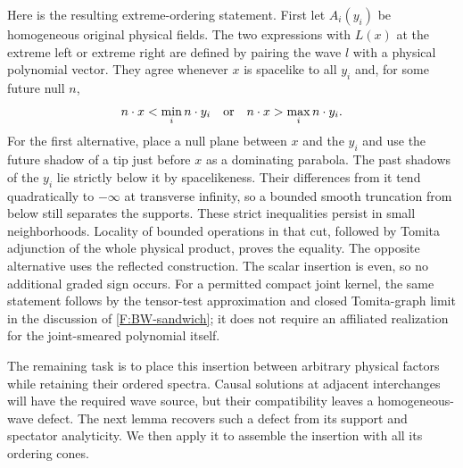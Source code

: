 Here is the resulting extreme-ordering statement. First let
$A_i(y_i)$ be homogeneous original physical fields. The two
expressions with $L(x)$ at the extreme left or
extreme right are defined by pairing the wave $l$ with a physical
polynomial vector. They agree whenever $x$ is spacelike to all $y_i$ and,
for some future null $n$,
\begin{equation}\label{C:extreme-patch}
 n\cdot x<\min_i n\cdot y_i
 \quad\hbox{or}\quad
 n\cdot x>\max_i n\cdot y_i.
\end{equation}
For the first alternative, place a null plane between $x$ and the
$y_i$ and use the future shadow of a tip just before $x$ as a dominating
parabola. The past shadows of the $y_i$ lie strictly below it by
spacelikeness. Their differences from it tend quadratically to
$-\infty$ at transverse infinity, so a bounded smooth truncation from
below still separates the supports. These strict inequalities persist
in small neighborhoods. Locality of bounded operations in that cut,
followed by Tomita adjunction of the whole physical product, proves the
equality. The opposite alternative uses the reflected construction.
The scalar insertion is even, so no additional graded sign occurs.
For a permitted compact joint kernel, the same statement follows by
the tensor-test approximation and closed Tomita-graph limit in the
discussion of \eqref{F:BW-sandwich}; it does not require an affiliated
realization for the joint-smeared polynomial itself.

The remaining task is to place this insertion between arbitrary
physical factors while retaining their ordered spectra. Causal solutions
at adjacent interchanges will have the required wave source, but their
compatibility leaves a homogeneous-wave defect. The next lemma recovers
such a defect from its support and spectator analyticity. We then apply
it to assemble the insertion with all its ordering cones.

